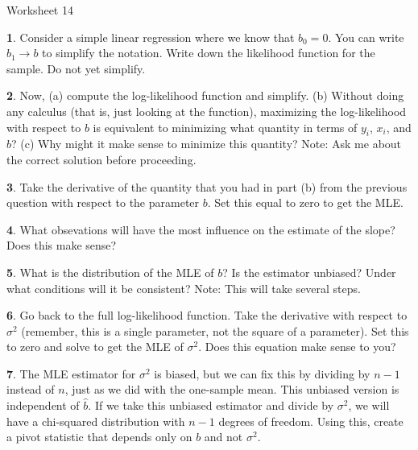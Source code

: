 \documentclass{tufte-handout}
\begin{document}
\justify

{\LARGE Worksheet 14}

\vspace*{18pt}


\textbf{1}. Consider a simple linear regression where we know that $b_0 = 0$. You can write
$b_1 \rightarrow b$ to simplify the notation. Write down the likelihood function
for the sample. Do not yet simplify.

\textbf{2}. Now, (a) compute the log-likelihood function and simplify. (b) Without doing any
calculus (that is, just looking at the function), maximizing the log-likelihood
with respect to $b$ is equivalent to minimizing what quantity in terms of $y_i$,
$x_i$, and $b$? (c) Why might it make sense to minimize this quantity?
Note: Ask me about the correct solution before proceeding. 

\textbf{3}. Take the derivative of the quantity that you had in part (b) from the previous
question with respect to the parameter $b$. Set this equal to zero to get the 
MLE.

\textbf{4}. What obsevations will have the most influence on the estimate of the slope?
Does this make sense?

\textbf{5}. What is the distribution of the MLE of $b$? Is the estimator unbiased? Under
what conditions will it be consistent? Note: This will take several steps.

\textbf{6}. Go back to the full log-likelihood function. Take the derivative with respect
to $\sigma^2$ (remember, this is a single parameter, not the square of a parameter).
Set this to zero and solve to get the MLE of $\sigma^2$. Does this equation make
sense to you?

\textbf{7}. The MLE estimator for $\sigma^2$ is biased, but we can fix this by dividing by
$n-1$ instead of $n$, just as we did with the one-sample mean. This unbiased
version is independent of $\widehat{b}$. If we take this unbiased estimator and
divide by $\sigma^2$, we will have a chi-squared distribution with $n-1$ degrees
of freedom. Using this, create a pivot statistic that depends only on $b$ and not
$\sigma^2$.
\end{document}
